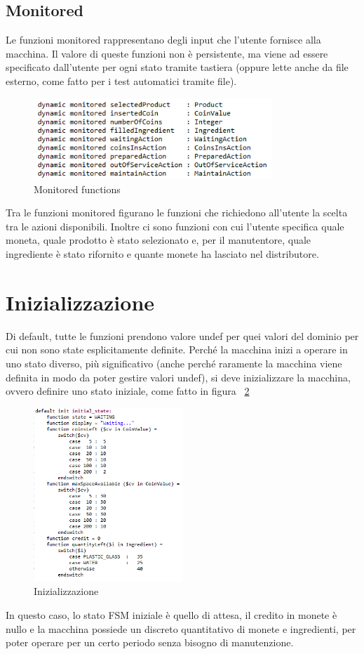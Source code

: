 \subsection{Monitored}
Le funzioni monitored rappresentano degli input che l’utente fornisce alla macchina. Il valore di queste funzioni non è persistente, ma viene ad essere specificato dall’utente per ogni stato tramite tastiera (oppure lette anche da file esterno, come fatto per i test automatici tramite file).
\begin{figure}[h]
	\centering
	\includegraphics[width=0.8\textwidth]{Immagini/MonitoredFunc.png}
	\caption{Monitored functions}
	\label{fig:monitoredFunc}
\end{figure}
Tra le funzioni monitored figurano le funzioni che richiedono all’utente la scelta tra le azioni disponibili. Inoltre ci sono funzioni con cui l’utente specifica quale moneta, quale prodotto è stato selezionato e, per il manutentore, quale ingrediente è stato rifornito e quante monete ha lasciato nel distributore.

\section{Inizializzazione}
Di default, tutte le funzioni prendono valore undef per quei valori del dominio per cui non sono state esplicitamente definite.	
Perché la macchina inizi a operare in uno stato diverso, più significativo (anche perché raramente la macchina viene definita in modo da poter gestire valori undef), si deve inizializzare la macchina, ovvero definire uno stato iniziale, come fatto in figura ~\ref{fig:initialState}

\begin{figure}[h]
	\centering
	\includegraphics[width=0.5\textwidth]{Immagini/InitialState.png}
	\caption{Inizializzazione}
	\label{fig:initialState}
\end{figure}
In questo caso, lo stato FSM iniziale è quello di attesa, il credito in monete è nullo e la macchina possiede un discreto quantitativo di monete e ingredienti, per poter operare per un certo periodo senza bisogno di manutenzione.

